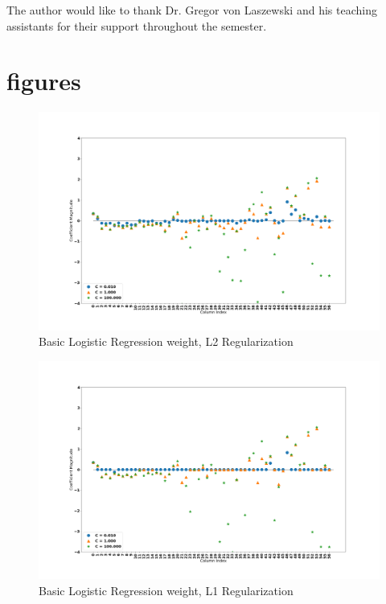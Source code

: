 \documentclass[sigconf]{acmart}
\begin{document}
\begin{acks}

The author would like to thank Dr. Gregor von Laszewski and his teaching assistants for their support throughout the semester.

\end{acks}




\section{figures}

\begin{figure}[!ht]
  \centering\includegraphics[width=\columnwidth]{images/weights_l2.png}
  \caption{Basic Logistic Regression weight, L2 Regularization}\label{f:weights_l2}
\end{figure}

\begin{figure}[!ht]
  \centering\includegraphics[width=\columnwidth]{images/weights_l1.png}
  \caption{Basic Logistic Regression weight, L1 Regularization}\label{f:weights_l1}
\end{figure}
\end{document}
